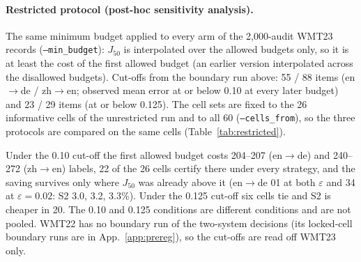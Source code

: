 \documentclass[11pt]{article}
\newcommand{\eps}{\varepsilon}
\newcommand{\Jt}{J_{50}}
\begin{document}
\paragraph{Restricted protocol (post-hoc sensitivity analysis).} The same minimum budget applied to every arm of
the 2,000-audit WMT23 records (\texttt{--min\_budget}): $\Jt$ is interpolated over the allowed budgets only, so it is
at least the cost of the first allowed budget (an earlier version interpolated across the disallowed budgets).
Cut-offs from the boundary run above: 55 / 88 items (en$\to$de / zh$\to$en; observed mean error at or below 0.10 at
every later budget) and 23 / 29 items (at or below 0.125). The cell sets are fixed to the 26 informative cells of the
unrestricted run and to all 60 (\texttt{--cells\_from}), so the three protocols are compared on the same cells (Table~\ref{tab:restricted}).
\begin{table}[t]\centering\footnotesize
{}
\caption{Post-hoc sensitivity analysis: the strategies under a protocol that issues no certificate below a minimum
post-pilot budget (en$\to$de / zh$\to$en items), the same rule for every strategy, on fixed cell sets. Means in points
of $\Jt$ with Monte-Carlo intervals (\texttt{S2\_vs\_S3\_wmt23\_n2000\_restricted*.md}).}\label{tab:restricted}
\end{table}
Under the
0.10 cut-off the first allowed budget costs 204--207 (en$\to$de) and 240--272 (zh$\to$en) labels, 22 of the 26 cells
certify there under every strategy, and the saving survives only where $\Jt$ was already above it (en$\to$de 01 at both
$\eps$ and 34 at $\eps=0.02$: S2 3.0, 3.2, 3.3\%). Under the 0.125 cut-off six cells tie and S2 is cheaper in 20. The
0.10 and 0.125 conditions are different conditions and are not pooled. WMT22 has no boundary run of the two-system
decisions (its locked-cell boundary runs are in App.~\ref{app:prereg}), so the cut-offs are read off WMT23 only.
\end{document}
